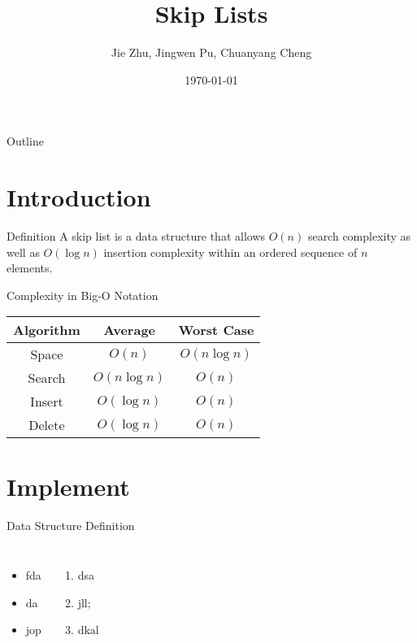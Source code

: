 \documentclass[12pt]{beamer}
\title{Skip Lists}
\date{\today}
\author{Jie Zhu, Jingwen Pu, Chuanyang Cheng}
\institute{Chollege of Computer and Technology, Zhejiang University}
\begin{document}
\maketitle

\begin{frame}{Outline}
	\tableofcontents
\end{frame}
\section{Introduction} 
\begin{frame}{Definition}
A skip list is a data structure that allows $O(n)$ search complexity as well as $O(\log n)$ insertion complexity within an ordered sequence of $n$ elements. \cite{pugh1990skip}
\end{frame}
\begin{frame}{Complexity in Big-O Notation}
\begin{table}[h]
\centering
\begin{tabular}{ccc}
Algorithm & Average & Worst Case \\
\hline
Space & $O(n)$ & $O(n\log n)$\cite{papadakis1993skip} \\
\hline
Search & $O(n\log n)$ & $O(n)$\cite{papadakis1993skip} \\
\hline
Insert & $O(\log n)$ & $O(n)$ \\ 
\hline
Delete & $O(\log n)$ & $O(n)$ \\
\hline
\end{tabular}
\end{table}
\end{frame}
\section{Implement}
\begin{frame}{Data Structure Definition}
	\begin{columns}
		\begin{itemize}
			\item fda
			\item da
			\item jop
		\end{itemize}
		\begin{enumerate}
			\item dsa
			\item jll;
			\item dkal
		\end{enumerate}
	\end{columns}
\end{frame}
\end{document}
